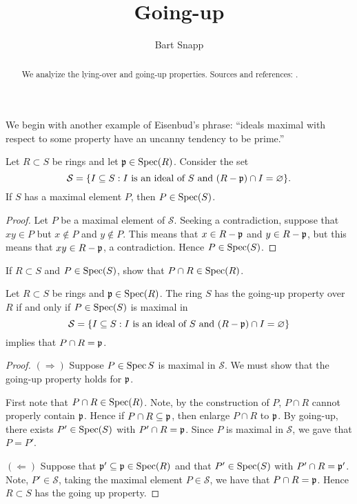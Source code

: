 \documentclass{ximera}
\author{Bart Snapp}
\title{Going-up}
\begin{document}
\begin{abstract}
  We analyize the lying-over and going-up properties. Sources and references:
  \cite{iK1966}.
\end{abstract}
\maketitle


We begin with another example of Eisenbud's phrase: ``ideals maximal
with respect to some property have an uncanny tendency to be prime.''


\begin{proposition}
  Let $R\subset S$ be rings and let $\mathfrak{p}\in\operatorname{Spec}(R)$. Consider the set
  \[
  \mathcal{S} = \{I\subseteq S: \text{$I$ is an ideal of $S$ and $(R-\mathfrak{p})\cap I = \varnothing$}\}.
  \]
  If $S$ has a maximal element $P$, then $P\in\operatorname{Spec}(S)$.
  \begin{proof}
    Let $P$ be a maximal element of $\mathcal{S}$. Seeking a
    contradiction, suppose that $xy\in P$ but $x\notin P$ and $y\notin
    P$. This means that $x\in R-\mathfrak{p}$ and $y\in R-\mathfrak{p}$, but this means
    that $xy\in R-\mathfrak{p}$, a contradiction. Hence $P\in\operatorname{Spec}(S)$.
  \end{proof}
\end{proposition}

\begin{exercise}
  If $R\subset S$ and $P\in\operatorname{Spec}(S)$, show that $P\cap R\in\operatorname{Spec}(R)$.
\end{exercise}


\begin{proposition}
  Let $R\subset S$ be rings and $\mathfrak{p}\in\operatorname{Spec}(R)$. The ring $S$ has the
  going-up property over $R$ if and only if $P\in\operatorname{Spec}(S)$ is maximal in
  \[
  \mathcal{S} = \{I\subseteq S: \text{$I$ is an ideal of $S$ and
    $(R-\mathfrak{p})\cap I = \varnothing$}\}
  \]
  implies that $P\cap R = \mathfrak{p}$.
  \begin{proof}
    $(\Rightarrow)$ Suppose $P\in\operatorname{Spec}{S}$ is maximal in
    $\mathcal{S}$. We must show that the going-up property holds for
    $\mathfrak{p}$.

    First note that $P\cap R\in\operatorname{Spec}(R)$. Note, by the construction of
    $P$, $P\cap R$ cannot properly contain $\mathfrak{p}$. Hence if $P\cap
    R\subseteq \mathfrak{p}$, then enlarge $P\cap R$ to $\mathfrak{p}$. By going-up, there
    exists $P'\in\operatorname{Spec}(S)$ with $P'\cap R = \mathfrak{p}$. Since $P$ is maximal
    in $\mathcal{S}$, we gave that $P=P'$.

    $(\Leftarrow)$ Suppose that $\mathfrak{p}'\subseteq\mathfrak{p}\in\operatorname{Spec}(R)$ and that
    $P'\in\operatorname{Spec}(S)$ with $P'\cap R = \mathfrak{p}'$. Note, $P'\in\mathcal{S}$,
    taking the maximal element $P\in\mathcal{S}$, we have that $P\cap
    R = \mathfrak{p}$. Hence $R\subset S$ has the going up property.
  \end{proof}
\end{proposition}
\end{document}
